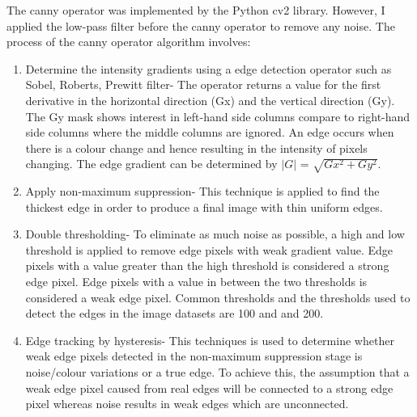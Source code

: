 The canny operator was implemented by the Python cv2 library. However, I applied the low-pass filter before the canny operator to remove any noise. The process of the canny operator algorithm involves:
\begin{enumerate}
	\item Determine the intensity gradients using a edge detection operator such as Sobel, Roberts, Prewitt filter- The operator returns a value for the first derivative in the horizontal direction (Gx) and the vertical direction (Gy). The Gy mask shows interest in left-hand side columns compare to right-hand side columns where the middle columns are ignored. An edge occurs when there is a colour change and hence resulting in the intensity of pixels changing. The edge gradient can be determined by $|G|$ = $\sqrt{Gx^{2} + Gy^{2}} $. 

	\item Apply non-maximum suppression- This technique is applied to find the thickest edge in order to produce a final image with thin uniform edges.
	\item Double thresholding- To eliminate as much noise as possible, a high and low threshold is applied to remove edge pixels with weak gradient value. Edge pixels with a value greater than the high threshold is considered a strong edge pixel. Edge pixels with a value in between the two thresholds is considered a weak edge pixel. Common thresholds and the thresholds used to detect the edges in the image datasets are 100 and and 200.
	\item Edge tracking by hysteresis- This techniques is used to determine whether weak edge pixels detected in the non-maximum suppression stage is noise/colour variations or a true edge. To achieve this, the assumption that a weak edge pixel caused from real edges will be connected to a strong edge pixel whereas noise results in weak edges which are unconnected. 
	
\end{enumerate}



